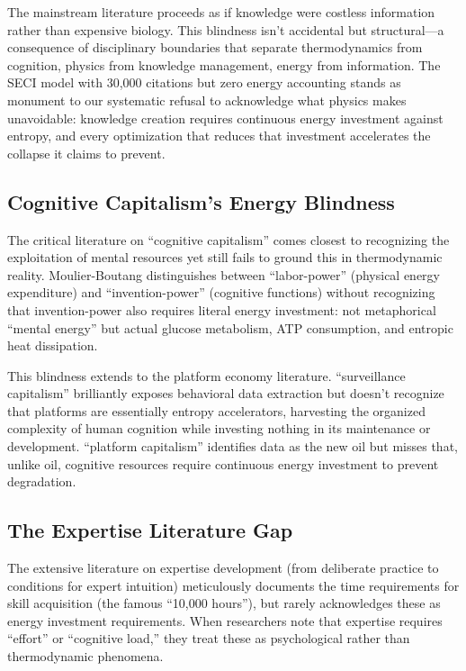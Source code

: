 The mainstream literature proceeds as if knowledge were costless information rather than expensive biology. This blindness isn't accidental but structural---a consequence of disciplinary boundaries that separate thermodynamics from cognition, physics from knowledge management, energy from information. The SECI model with 30,000 citations but zero energy accounting stands as monument to our systematic refusal to acknowledge what physics makes unavoidable: knowledge creation requires continuous energy investment against entropy, and every optimization that reduces that investment accelerates the collapse it claims to prevent.

\subsection{Cognitive Capitalism's Energy Blindness}

The critical literature on ``cognitive capitalism'' \citep{moulierboutang2007, vercellone2007} comes closest to recognizing the exploitation of mental resources yet still fails to ground this in thermodynamic reality. Moulier-Boutang distinguishes between ``labor-power'' (physical energy expenditure) and ``invention-power'' (cognitive functions) without recognizing that invention-power also requires literal energy investment: not metaphorical ``mental energy'' but actual glucose metabolism, ATP consumption, and entropic heat dissipation.

This blindness extends to the platform economy literature. \citet{zuboff2019} ``surveillance capitalism'' brilliantly exposes behavioral data extraction but doesn't recognize that platforms are essentially entropy accelerators, harvesting the organized complexity of human cognition while investing nothing in its maintenance or development. \citet{srnicek2017} ``platform capitalism'' identifies data as the new oil but misses that, unlike oil, cognitive resources require continuous energy investment to prevent degradation.

\subsection{The Expertise Literature Gap}

The extensive literature on expertise development (from \citet{ericsson2006} deliberate practice to \citet{kahneman2009} conditions for expert intuition) meticulously documents the time requirements for skill acquisition (the famous ``10,000 hours''), but rarely acknowledges these as energy investment requirements. When researchers note that expertise requires ``effort'' or ``cognitive load,'' they treat these as psychological rather than thermodynamic phenomena.

